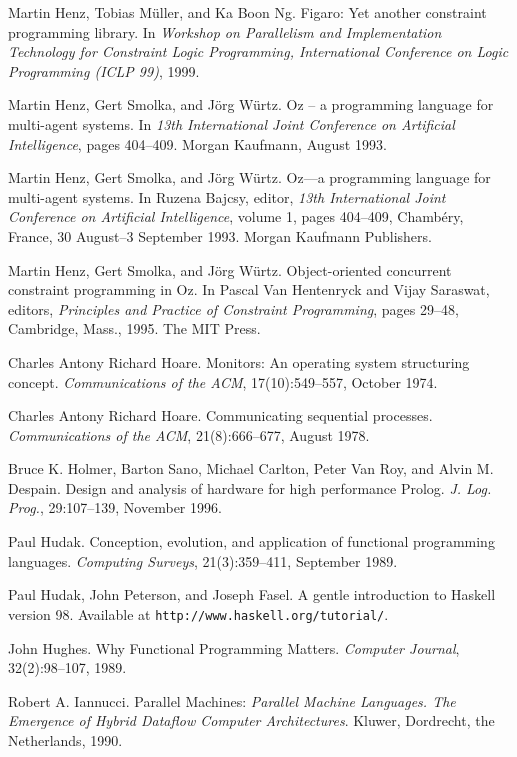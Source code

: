 \begin{thebibliography}{213}
Martin Henz, Tobias M\"uller, and Ka Boon Ng. Figaro: Yet another constraint programming library. In \emph{Workshop on Parallelism and Implementation Technology for Constraint Logic Programming, International Conference on Logic Programming (ICLP 99)}, 1999.

Martin Henz, Gert Smolka, and J\"org W\"urtz. Oz – a programming language for multi-agent systems. In \emph{13th International Joint Conference on Artificial Intelligence}, pages 404–409. Morgan Kaufmann, August 1993.

Martin Henz, Gert Smolka, and J\"org W\"urtz. Oz—a programming language for multi-agent systems. In Ruzena Bajcsy, editor, \emph{13th International Joint Conference on Artificial Intelligence}, volume 1, pages 404–409, Chamb\'ery, France, 30 August–3 September 1993. Morgan Kaufmann Publishers.

Martin Henz, Gert Smolka, and J\"org W\"urtz. Object-oriented concurrent constraint programming in Oz. In Pascal Van Hentenryck and Vijay Saraswat, editors, \emph{Principles and Practice of Constraint Programming}, pages 29–48, Cambridge, Mass., 1995. The MIT Press.

Charles Antony Richard Hoare. Monitors: An operating system structuring concept. \emph{Communications of the ACM}, 17(10):549–557, October 1974.

Charles Antony Richard Hoare. Communicating sequential processes. \emph{Communications of the ACM}, 21(8):666–677, August 1978.

Bruce K. Holmer, Barton Sano, Michael Carlton, Peter Van Roy, and Alvin M. Despain. Design and analysis of hardware for high performance Prolog. \emph{J. Log. Prog.}, 29:107–139, November 1996.

Paul Hudak. Conception, evolution, and application of functional programming languages. \emph{Computing Surveys}, 21(3):359–411, September 1989.

Paul Hudak, John Peterson, and Joseph Fasel. A gentle introduction to Haskell version 98. Available at \verb"http://www.haskell.org/tutorial/".

John Hughes. Why Functional Programming Matters. \emph{Computer Journal}, 32(2):98–107, 1989.

Robert A. Iannucci. Parallel Machines: \emph{Parallel Machine Languages. The Emergence of Hybrid Dataflow Computer Architectures}. Kluwer, Dordrecht, the Netherlands, 1990.


\end{thebibliography}
